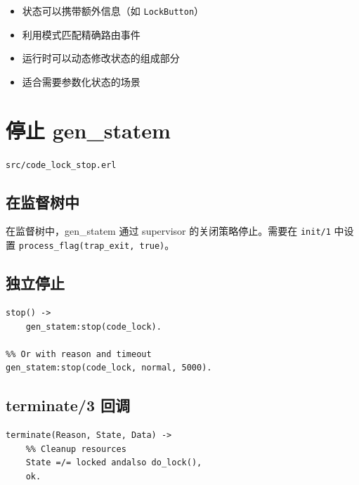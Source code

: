 \documentclass[a4paper,11pt]{article}
\begin{document}
\begin{tipbox}[复杂状态的优势]
\begin{itemize}[leftmargin=1.5em]
    \item 状态可以携带额外信息（如 \texttt{LockButton}）
    \item 利用模式匹配精确路由事件
    \item 运行时可以动态修改状态的组成部分
    \item 适合需要参数化状态的场景
\end{itemize}
\end{tipbox}


\section{停止 gen\_statem}

\begin{notebox}[源码文件]
\texttt{src/code\_lock\_stop.erl}
\end{notebox}

\subsection{在监督树中}

在监督树中，gen\_statem 通过 supervisor 的关闭策略停止。需要在 \texttt{init/1} 中设置 \texttt{process\_flag(trap\_exit, true)}。

\subsection{独立停止}

\begin{lstlisting}[style=erlangstyle]
%% API function
stop() ->
    gen_statem:stop(code_lock).

%% Or with reason and timeout
gen_statem:stop(code_lock, normal, 5000).
\end{lstlisting}

\subsection{terminate/3 回调}

\begin{lstlisting}[style=erlangstyle]
terminate(Reason, State, Data) ->
    %% Cleanup resources
    State =/= locked andalso do_lock(),
    ok.
\end{lstlisting}
\end{document}

